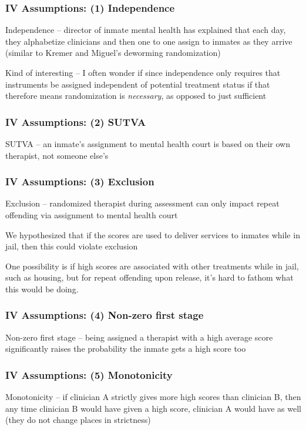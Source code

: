 \documentclass{beamer}
\begin{document}
\begin{frame}
  \frametitle{IV Assumptions: (1) Independence}

  Independence -- director of inmate mental health has explained that each day, they alphabetize clinicians and then one to one assign to inmates as they arrive (similar to Kremer and Miguel's deworming randomization)

  \bigskip

  Kind of interesting -- I often wonder if since independence only requires that instruments be assigned independent of potential treatment status if that therefore means randomization is \emph{necessary}, as opposed to just sufficient

\end{frame}

\begin{frame}
  \frametitle{IV Assumptions: (2) SUTVA}

  SUTVA -- an inmate's assignment to mental health court is based on their own therapist, not someone else's


\end{frame}


\begin{frame}
  \frametitle{IV Assumptions: (3) Exclusion}

  Exclusion -- randomized therapist during assessment can only impact repeat offending via assignment to mental health court

  \bigskip

  We hypothesized that if the scores are used to deliver services to inmates while in jail, then this could violate exclusion

  \bigskip

  One possibility is if high scores are associated with other treatments while in jail, such as housing, but for repeat offending upon release, it's hard to fathom what this would be doing.



\end{frame}


\begin{frame}
  \frametitle{IV Assumptions: (4) Non-zero first stage}

  Non-zero first stage -- being assigned a therapist with a high average score significantly raises the probability the inmate gets a high score too

\end{frame}


\begin{frame}
  \frametitle{IV Assumptions: (5) Monotonicity}

  Monotonicity -- if clinician A strictly gives more high scores than clinician B, then any time clinician B would have given a high score, clinician A would have as well (they do not change places in strictness)

\end{frame}
\end{document}
